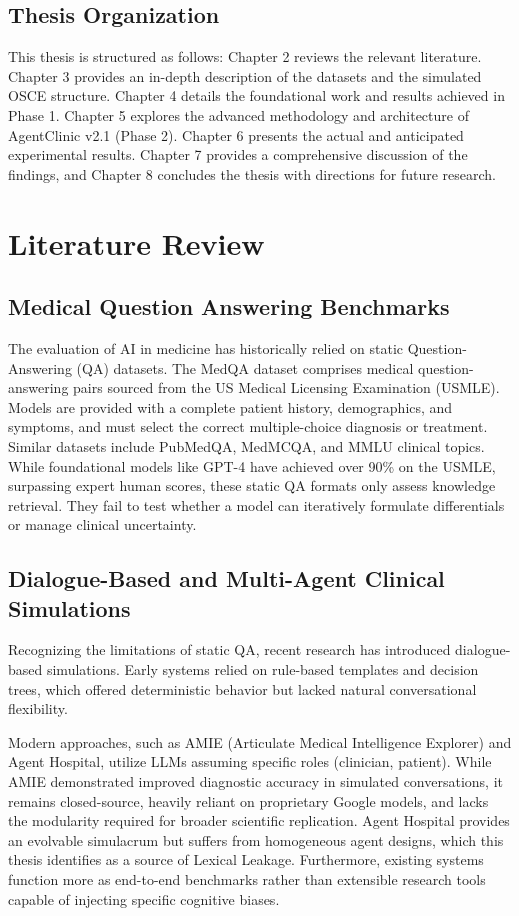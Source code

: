 \documentclass[12pt, a4paper, twoside]{report}
\begin{document}
\section{Thesis Organization}
This thesis is structured as follows: Chapter 2 reviews the relevant literature. Chapter 3 provides an in-depth description of the datasets and the simulated OSCE structure. Chapter 4 details the foundational work and results achieved in Phase 1. Chapter 5 explores the advanced methodology and architecture of AgentClinic v2.1 (Phase 2). Chapter 6 presents the actual and anticipated experimental results. Chapter 7 provides a comprehensive discussion of the findings, and Chapter 8 concludes the thesis with directions for future research.

\chapter{Literature Review}

\section{Medical Question Answering Benchmarks}
The evaluation of AI in medicine has historically relied on static Question-Answering (QA) datasets. The MedQA dataset comprises medical question-answering pairs sourced from the US Medical Licensing Examination (USMLE). Models are provided with a complete patient history, demographics, and symptoms, and must select the correct multiple-choice diagnosis or treatment. Similar datasets include PubMedQA, MedMCQA, and MMLU clinical topics. While foundational models like GPT-4 have achieved over 90\% on the USMLE, surpassing expert human scores, these static QA formats only assess knowledge retrieval. They fail to test whether a model can iteratively formulate differentials or manage clinical uncertainty.

\section{Dialogue-Based and Multi-Agent Clinical Simulations}
Recognizing the limitations of static QA, recent research has introduced dialogue-based simulations. Early systems relied on rule-based templates and decision trees, which offered deterministic behavior but lacked natural conversational flexibility. 

Modern approaches, such as AMIE (Articulate Medical Intelligence Explorer) and Agent Hospital, utilize LLMs assuming specific roles (clinician, patient). While AMIE demonstrated improved diagnostic accuracy in simulated conversations, it remains closed-source, heavily reliant on proprietary Google models, and lacks the modularity required for broader scientific replication. Agent Hospital provides an evolvable simulacrum but suffers from homogeneous agent designs, which this thesis identifies as a source of Lexical Leakage. Furthermore, existing systems function more as end-to-end benchmarks rather than extensible research tools capable of injecting specific cognitive biases.
\end{document}
